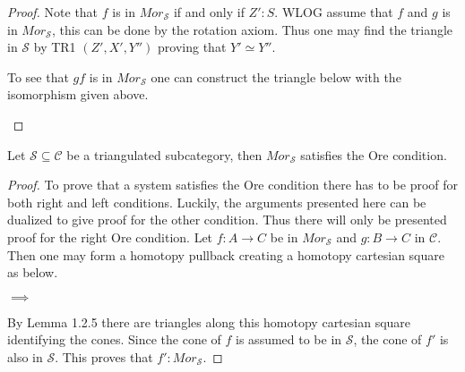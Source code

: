 \begin{proof}
        Note that $f$ is in $Mor_\mathcal{S}$ if and only if $Z' : S$. WLOG assume that $f$ and $g$ is in $Mor_\mathcal{S}$, this can be done by the rotation axiom. Thus one may find the triangle in $\mathcal{S}$ by TR1 $(Z',X',Y'')$ proving that $Y'\simeq Y''$.
        \begin{center}
        \end{center}
        To see that $gf$ is in $Mor_\mathcal{S}$ one can construct the triangle below with the isomorphism given above.
        \begin{center}
        \end{center}
    \end{proof}

    \begin{prop}
        Let $\mathcal{S}\subseteq\mathcal{C}$ be a triangulated subcategory, then $Mor_\mathcal{S}$ satisfies the Ore condition.
    \end{prop}

    \begin{proof}
        To prove that a system satisfies the Ore condition there has to be proof for both right and left conditions. Luckily, the arguments presented here can be dualized to give proof for the other condition. Thus there will only be presented proof for the right Ore condition.
        Let $f:A\rightarrow C$ be in $Mor_\mathcal{S}$ and $g:B\rightarrow C$ in $\mathcal{C}$. Then one may form a homotopy pullback creating a homotopy cartesian square as below.
        \begin{center}
            $\implies$
        \end{center}
        By Lemma 1.2.5 there are triangles along this homotopy cartesian square identifying the cones. Since the cone of $f$ is assumed to be in $\mathcal{S}$, the cone of $f'$ is also in $\mathcal{S}$. This proves that $f':Mor_\mathcal{S}$.
    \end{proof}

